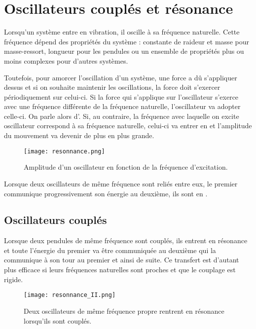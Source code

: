 \chapter{Oscillateurs couplés et résonance}
Lorsqu'un système entre en vibration, il oscille à sa fréquence naturelle. Cette fréquence dépend des propriétés du système : constante de raideur et masse pour masse-ressort, longueur pour les pendules ou un ensemble de propriétés plus ou moins complexes pour d'autres systèmes.

Toutefois, pour amorcer l'oscillation d'un système, une force a dû s'appliquer dessus et si on souhaite maintenir les oscillations, la force doit s'exercer périodiquement sur celui-ci. Si la force qui s'applique sur l'oscillateur s'exerce avec une fréquence différente de la fréquence naturelle, l'oscillateur va adopter celle-ci. On parle alors d'.
Si, au contraire, la fréquence avec laquelle on excite oscillateur correspond à sa fréquence naturelle, celui-ci va entrer en  et l'amplitude du mouvement va devenir de plus en plus grande.

\begin{figure}[ht!]
    \centering
    \texttt{[image: resonnance.png]}
    \caption{Amplitude d'un oscillateur en fonction de la fréquence d'excitation.}
    \label{resonnanceI}
\end{figure}

\begin{encadre}
    Lorsque deux oscillateurs de même fréquence sont reliés entre eux, le premier communique progressivement son énergie au deuxième, ils sont en .
\end{encadre}

\newpage

\section{Oscillateurs couplés}
Lorsque deux pendules de même fréquence sont couplés, ils entrent en résonance et toute l'énergie du premier va être communiquée au deuxième qui la communique à son tour au premier et ainsi de suite. Ce transfert est d'autant plus efficace si leurs fréquences naturelles sont proches et que le couplage est rigide.

\begin{figure}[ht!]
    \centering
    \texttt{[image: resonnance\_II.png]}
    \caption{Deux oscillateurs de même fréquence propre rentrent en résonance lorsqu'ils sont couplés.}
    \label{resonnanceII}
\end{figure}

